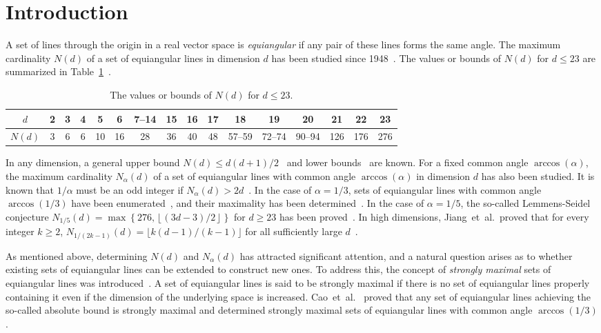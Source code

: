 \documentclass[reqno, 11pt]{amsart}
\numberwithin{equation}{section}
\theoremstyle{definition}
\begin{document}
\section{Introduction}
A set of lines through the origin in a real vector space is \emph{equiangular} if any pair of these lines forms the same angle.
The maximum cardinality $N(d)$ of a set of equiangular lines in dimension $d$ has been studied since 1948~\cite{Haantjes1948}.
The values or bounds of $N(d)$ for $d \leq 23$ are summarized in Table~\ref{table:N(d)}~\cite{Greaves2022, Greaves2020, Greaves2023, Haantjes1948, lemmens1973, Lint1966}.
\begin{table}[hbtp]
	\caption{The values or bounds of $N(d)$ for $d \leq 23$.}
	\label{table:N(d)}
	\centering
	\begin{tabular}{c|ccccccccccccccc}
		$d$    & 2 & 3 & 4 & 5  & 6  & 7--14 & 15 & 16 & 17 & 18     & 19     & 20     & 21  & 22  & 23  \\
		\hline
		$N(d)$ & 3 & 6 & 6 & 10 & 16 & 28    & 36 & 40 & 48 & 57--59 & 72--74 & 90--94 & 126 & 176 & 276 \\
	\end{tabular}
\end{table}
In any dimension, a general upper bound $N(d) \leq d(d+1)/2$~\cite{lemmens1973} and lower bounds~\cite{de2000, GKMS} are known.
For a fixed common angle $\arccos(\alpha)$, the maximum cardinality $N_{\alpha}(d)$ of a set of equiangular lines with common angle $\arccos(\alpha)$ in dimension $d$ has also been studied.
It is known that $1/\alpha$ must be an odd integer if $N_\alpha(d) > 2d$~\cite[Theorem~3.4]{lemmens1973}.
In the case of $\alpha = 1/3$, sets of equiangular lines with common angle $\arccos(1/3)$ have been enumerated~\cite{Szollosi2018, yoshino2023}, and their maximality has been determined~\cite{cao2021}.
In the case of $\alpha = 1/5$, the so-called Lemmens-Seidel conjecture
$
	N_{1/5}(d) = \max\left\{
	276,
	\left\lfloor (3d-3)/2 \right\rfloor
	\right\}
$
for $d \geq 23$ has been proved~\cite{cao2022, lemmens1973, yoshino2023}.
In high dimensions, Jiang~et~al.\ proved that for every integer $k \geq 2$,
$N_{1/(2k-1)}(d) = \lfloor k(d-1)/(k-1) \rfloor$
for all sufficiently large $d$~\cite{Zhao2021}.

As mentioned above, determining $ N(d) $ and $ N_\alpha(d) $ has attracted significant attention, and a natural question arises as to whether existing sets of equiangular lines can be extended to construct new ones.
To address this, the concept of \emph{strongly maximal} sets of equiangular lines was introduced~\cite{cao2021}.
A set of equiangular lines is said to be strongly maximal if there is no set of equiangular lines properly containing it even if the dimension of the underlying space is increased.
Cao~et~al.~\cite{cao2021} proved that any set of equiangular lines achieving the so-called absolute bound is strongly maximal and determined strongly maximal sets of equiangular lines with common angle $\arccos(1/3)$.
\end{document}
